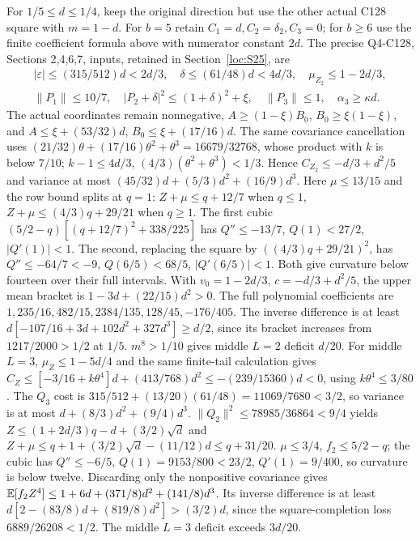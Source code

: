 For $1/5\le d\le1/4$, keep the original direction but use the
other actual C128 square with $m=1-d$.
For $b=5$ retain $C_1=d,C_2=\delta_2,C_3=0$; for $b\ge6$ use
the finite coefficient formula above with numerator constant $2d$.
The precise Q4-C128, Sections 2,4,6,7, inputs, retained in
Section~\ref{loc:S25}, are
\begin{equation}\tag{L77.6.1}\label{eq:L77:middleinputs}
\begin{gathered}
|\varepsilon|\le(315/512)d<2d/3,\quad
\delta\le(61/48)d<4d/3,\quad\mu_{Z_2}\le1-2d/3,\\
\|P_1\|\le10/7,\quad |P_2+\delta|^2\le(1+\delta)^2+\xi,
\quad\|P_3\|\le1,\quad\alpha_3\ge\kappa d.
\end{gathered}
\end{equation}
The actual coordinates remain nonnegative, $A\ge(1-\xi)B_0$,
$B_0\ge\xi(1-\xi)$, and
$A\le\xi+(53/32)d$, $B_0\le\xi+(17/16)d$.
The same covariance cancellation uses
$(21/32)\theta+(17/16)\theta^2+\theta^3=16679/32768$,
whose product with $k$ is below $7/10$;
$k-1\le4d/3$, $(4/3)(\theta^2+\theta^3)<1/3$.
Hence $C_{Z_2}\le-d/3+d^2/5$ and variance at most
$(45/32)d+(5/3)d^2+(16/9)d^3$.
Here $\mu\le13/15$ and the row bound splits at $q=1$:
$Z+\mu\le q+12/7$ when $q\le1$,
$Z+\mu\le(4/3)q+29/21$ when $q\ge1$.
The first cubic $(5/2-q)[(q+12/7)^2+338/225]$ has
$Q''\le-13/7$, $Q(1)<27/2$, $|Q'(1)|<1$.
The second, replacing the square by $((4/3)q+29/21)^2$, has
$Q''\le-64/7<-9$, $Q(6/5)<68/5$, $|Q'(6/5)|<1$.
Both give curvature below fourteen over their full intervals.
With $v_0=1-2d/3$, $c=-d/3+d^2/5$, the upper mean bracket is
$1-3d+(22/15)d^2>0$.
The full polynomial coefficients are
$1,\allowbreak 235/16,\allowbreak 482/15,\allowbreak 2384/135,\allowbreak 128/45,\allowbreak -176/405$.
The inverse difference is at least
$d[-107/16+3d+102d^2+327d^3]\ge d/2$,
since its bracket increases from $1217/2000>1/2$ at $1/5$.
$m^8>1/10$ gives middle $L=2$ deficit $d/20$.
For middle $L=3$, $\mu_Z\le1-5d/4$ and the same finite-tail
calculation gives
$C_Z\le[-3/16+k\theta^4]d+(413/768)d^2
\le-(239/15360)d<0$, using $k\theta^4\le3/80$.
The $Q_3$ cost is
$315/512+(13/20)(61/48)=11069/7680<3/2$,
so variance is at most $d+(8/3)d^2+(9/4)d^3$.
$\|Q_2\|^2\le78985/36864<9/4$ yields
$Z\le(1+2d/3)q-d+(3/2)\sqrt d$ and
$Z+\mu\le q+1+(3/2)\sqrt d-(11/12)d\le q+31/20$.
$\mu\le3/4$, $f_2\le5/2-q$; the cubic has
$Q''\le-6/5$, $Q(1)=9153/800<23/2$, $Q'(1)=9/400$, so
curvature is below twelve.
Discarding only the nonpositive covariance gives
$\mathbb E[f_2Z^4]\le1+6d+(371/8)d^2+(141/8)d^3$.
Its inverse difference is at least
$d[2-(83/8)d+(819/8)d^2]>(3/2)d$,
since the square-completion loss $6889/26208<1/2$.
The middle $L=3$ deficit exceeds $3d/20$.

